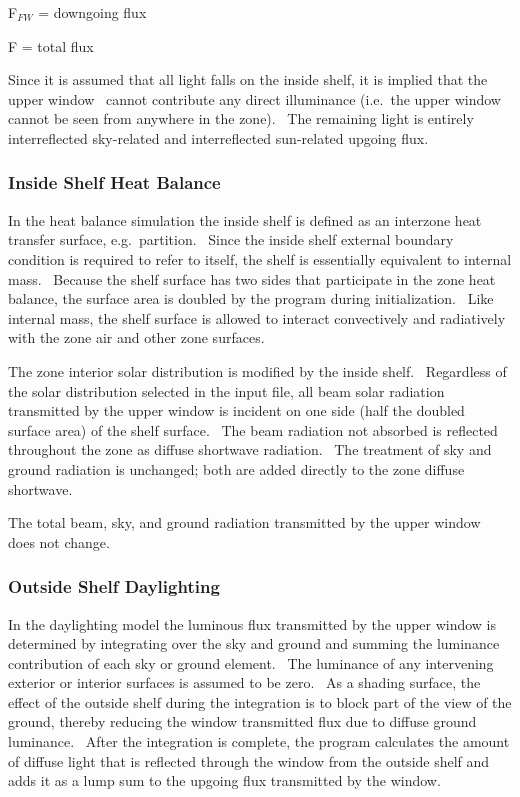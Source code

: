 F\(_{FW}\) = downgoing flux

F = total flux

Since it is assumed that all light falls on the inside shelf, it is implied that the upper window~ cannot contribute any direct illuminance (i.e.~the upper window cannot be seen from anywhere in the zone).~ The remaining light is entirely interreflected sky-related and interreflected sun-related upgoing flux.

\subsubsection{Inside Shelf Heat Balance}\label{inside-shelf-heat-balance}

In the heat balance simulation the inside shelf is defined as an interzone heat transfer surface, e.g.~partition.~ Since the inside shelf external boundary condition is required to refer to itself, the shelf is essentially equivalent to internal mass.~ Because the shelf surface has two sides that participate in the zone heat balance, the surface area is doubled by the program during initialization.~ Like internal mass, the shelf surface is allowed to interact convectively and radiatively with the zone air and other zone surfaces.

The zone interior solar distribution is modified by the inside shelf.~ Regardless of the solar distribution selected in the input file, all beam solar radiation transmitted by the upper window is incident on one side (half the doubled surface area) of the shelf surface.~ The beam radiation not absorbed is reflected throughout the zone as diffuse shortwave radiation.~ The treatment of sky and ground radiation is unchanged; both are added directly to the zone diffuse shortwave.

The total beam, sky, and ground radiation transmitted by the upper window does not change.

\subsubsection{Outside Shelf Daylighting}\label{outside-shelf-daylighting}

In the daylighting model the luminous flux transmitted by the upper window is determined by integrating over the sky and ground and summing the luminance contribution of each sky or ground element.~ The luminance of any intervening exterior or interior surfaces is assumed to be zero.~ As a shading surface, the effect of the outside shelf during the integration is to block part of the view of the ground, thereby reducing the window transmitted flux due to diffuse ground luminance.~ After the integration is complete, the program calculates the amount of diffuse light that is reflected through the window from the outside shelf and adds it as a lump sum to the upgoing flux transmitted by the window.

